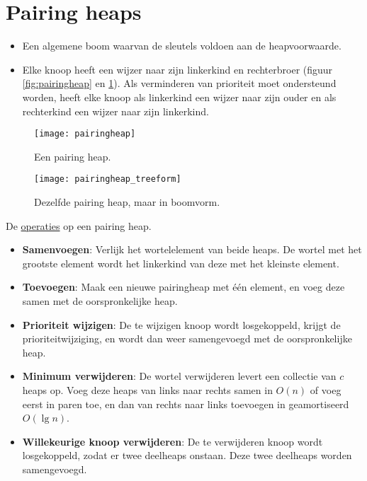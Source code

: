 \section{Pairing heaps}
		\begin{itemize}
			\item Een algemene boom waarvan de sleutels voldoen aan de heapvoorwaarde.
			\item Elke knoop heeft een wijzer naar zijn linkerkind en rechterbroer (figuur \ref{fig:pairingheap} en \ref{fig:pairingheap_treeform}). Als verminderen van prioriteit moet ondersteund worden, heeft elke knoop als linkerkind een wijzer naar zijn ouder en als rechterkind een wijzer naar zijn linkerkind.
		\end{itemize}
		\begin{figure}[ht]
			\centering
			\begin{minipage}{.49\textwidth}
				\centering
				\texttt{[image: pairingheap]}
				\caption{Een pairing heap.}
				\label{fig:pairingheap}
			\end{minipage}
			\begin{minipage}{.49\textwidth}
				\centering
				\texttt{[image: pairingheap\_treeform]}
				\caption{Dezelfde pairing heap, maar in boomvorm.}
				\label{fig:pairingheap_treeform}
			\end{minipage}%
		\end{figure}

		De \underline{operaties} op een pairing heap.
		\begin{itemize}
			\item \textbf{Samenvoegen}: Verlijk het wortelelement van beide heaps. De wortel met het grootste element wordt het linkerkind van deze met het kleinste element.
			\item \textbf{Toevoegen}: Maak een nieuwe pairingheap met één element, en voeg deze samen met de oorspronkelijke heap.
			\item \textbf{Prioriteit wijzigen}: De te wijzigen knoop wordt losgekoppeld, krijgt de prioriteitwijziging, en wordt dan weer samengevoegd met de oorspronkelijke heap.
			\item \textbf{Minimum verwijderen}: De wortel verwijderen levert een collectie van $c$ heaps op. Voeg deze heaps van links naar rechts samen in $O(n)$ of voeg eerst in paren toe, en dan van rechts naar links toevoegen in geamortiseerd $O(\lg n)$.
			\item \textbf{Willekeurige knoop verwijderen}: De te verwijderen knoop wordt losgekoppeld, zodat er twee deelheaps onstaan. Deze twee deelheaps worden samengevoegd.
		\end{itemize}
